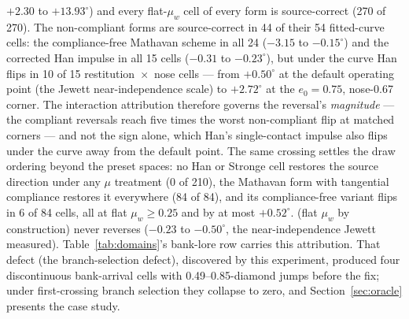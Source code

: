 $+2.30$ to $+13.93^\circ$) and every flat-$\mu_w$ cell of every form
is source-correct (270 of 270). The non-compliant forms are
source-correct in 44 of their 54 fitted-curve cells: the
compliance-free Mathavan scheme in all 24 ($-3.15$ to $-0.15^\circ$)
and the corrected Han impulse in all 15  cells
($-0.31$ to $-0.23^\circ$), but under the  curve Han
flips in 10 of 15 restitution~$\times$~nose cells --- from
$+0.50^\circ$ at the default operating point (the Jewett
near-independence scale) to $+2.72^\circ$ at the $e_0 = 0.75$,
nose-0.67 corner. The interaction attribution therefore governs the
reversal's \emph{magnitude} --- the compliant reversals reach five
times the worst non-compliant flip at matched corners --- and not the
sign alone, which Han's single-contact impulse also flips under the
 curve away from the default point. The same
crossing settles the draw ordering beyond the preset spaces: no Han
or Stronge cell restores the source direction under any $\mu$
treatment (0 of 210), the Mathavan form with tangential compliance
restores it everywhere (84 of 84), and its compliance-free variant
flips in 6 of 84 cells, all at flat $\mu_w \geq 0.25$ and by at most
$+0.52^\circ$.
 (flat $\mu_w$ by construction) never reverses
($-0.23$ to $-0.50^\circ$, the near-independence Jewett measured).
Table~\ref{tab:domains}'s bank-lore row carries this attribution.
That defect (the branch-selection defect), discovered by this
experiment, produced four
discontinuous  bank-arrival cells with
0.49--0.85-diamond jumps before the fix; under first-crossing branch
selection they collapse to zero,
and Section~\ref{sec:oracle} presents the case study.

